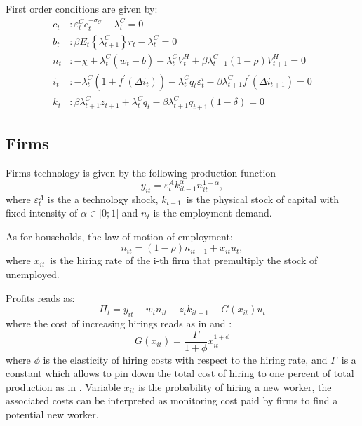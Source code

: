 \documentclass[a4paper,12pt]{article}%
\begin{document}
First order conditions are given by:%
\begin{align}
c_{t} &  :\varepsilon_{t}^{C}c_{t}^{-\sigma_{C}}-\lambda_{t}^{C}=0\\
b_{t} &  :\beta E_{t}\left\{  \lambda_{t+1}^{C}\right\}  r_{t}-\lambda_{t}%
^{C}=0\\
n_{t} &  :-\chi+\lambda_{t}^{C}\left(  w_{t}-\bar{b}\right)  -\lambda_{t}%
^{C}V_{t}^{H}+\beta\lambda_{t+1}^{C}\left(  1-\rho\right)  V_{t+1}^{H}=0\\
i_{t} &  :-\lambda_{t}^{C}\left(  1+f^{\prime}\left(  \Delta i_{t}\right)
\right)  -\lambda_{t}^{C}q_{t}\varepsilon_{t}^{i}-\beta\lambda_{t+1}%
^{C}f^{\prime}\left(  \Delta i_{t+1}\right)  =0\\
k_{t} &  :\beta\lambda_{t+1}^{C}z_{t+1}+\lambda_{t}^{C}q_{t}-\beta
\lambda_{t+1}^{C}q_{t+1}\left(  1-\delta\right)  =0
\end{align}


\subsection{Firms}

Firms technology is given by the following production function%
\begin{equation}
y_{it}=\varepsilon_{t}^{A}k_{it-1}^{\alpha}n_{it}^{1-\alpha},
\end{equation}
where $\varepsilon_{t}^{A}$ is the a technology shock, $k_{t-1}$\ is the
physical stock of capital with fixed intensity of $\alpha\in\lbrack0;1]$ and
$n_{t}$ is the employment demand.

As for households, the law of motion of employment:%
\begin{equation}
n_{it}=\left(  1-\rho\right)  n_{it-1}+x_{it}u_{t},
\end{equation}
where $x_{it}$\ is the hiring rate of the i-th firm that premultiply the stock
of unemployed.

Profits reads as:%
\begin{equation}
\Pi_{t}=y_{it}-w_{t}n_{it}-z_{t}k_{it-1}-G\left(  x_{it}\right)  u_{t}%
\end{equation}
where the cost of increasing hirings reads as in \cite{gali2010monetary} and
\cite{blanchard2010labor}:
\[
G\left(  x_{it}\right)  =\frac{\Gamma}{1+\phi}x_{it}^{1+\phi}%
\]
where $\phi$ is the elasticity of hiring costs with respect to the hiring
rate, and $\Gamma$\ is a constant which allows to pin down the total cost of
hiring to one percent of total production as in \cite{blanchard2010labor}.
Variable $x_{it}$ is the probability of hiring a new worker, the associated
costs can be interpreted as monitoring cost paid by firms to find a potential
new worker.
\end{document}
